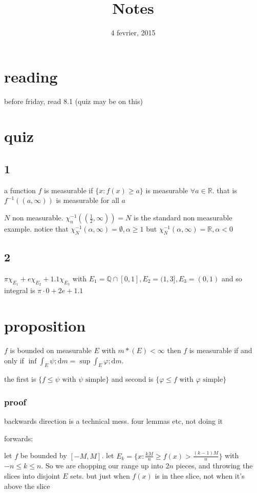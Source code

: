 \documentclass[letterpaper]{article}
\begin{document}
\title{Notes}
\date{4 fevrier, 2015}
\maketitle
\section*{reading}
before friday, read 8.1 (quiz may be on this)

\section*{quiz}
\subsection*{1}
a function $f$ is measurable if $\{x:f(x)\ge a\}$ is measurable $\forall a\in \mathbb{R}$. that is $f^{-1}((a,\infty))$ is measurable for all $a$

$N$ non measurable. $\chi_{n}^{-1}((\frac{1}{2},\infty))=N$ is the standard non measurable example. notice that $\chi_{N}^{-1}(\alpha,\infty)=\emptyset, \alpha\ge 1$ but $\chi_{N}^{-1}(\alpha,\infty)=\mathbb{R}, \alpha<0$
\subsection*{2}
$\pi \chi_{E_1}+e \chi_{E_2}+1.1 \chi_{E_3}$ with $E_1=\mathbb{Q}\cap[0,1], E_2=(1,3], E_3=(0,1)$ and so integral is $\pi\cdot 0+2e+1.1$

\section*{proposition}
$f$ is bounded on measurable $E$ with $m*(E)<\infty$ then $f$ is measurable if and only if $\inf \int_{E}\psi;\mathrm{d}m=\sup\int_E\varphi;\mathrm{d}m$.

the first is $\{f\le \psi\text{ with }\psi \text{ simple}\}$ and second is $\{\varphi\le f\text{ with }\varphi\text{ simple}\}$

\subsubsection*{proof}
backwards direction is a technical mess. four lemmas etc, not doing it

forwards:

let $f$ be bounded by $[-M,M]$. let $E_k=\{x:\frac{kM}{n}\ge f(x)>\frac{(k-1)M}{n}\}$ with $-n\le k\le n$. So we are chopping our range up into $2n$ pieces, and throwing the slices into disjoint $E$ sets. but just when $f(x)$ is in thee slice, not when it's above the slice
\end{document}
